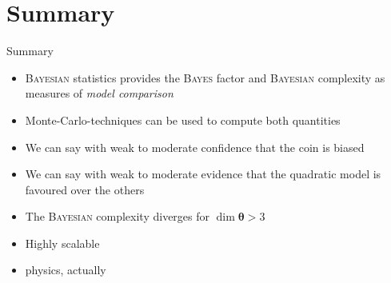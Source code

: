 \documentclass[11pt,aspectratio=1610,dvipsnames]{beamer}
\newcommand{\btheta}{\boldsymbol{\theta}}
\begin{document}
\section{Summary}
\begin{frame}{Summary}
	\begin{minipage}{0.49\linewidth}
			\begin{tcolorbox}[colback=blue!5,colframe=gray!15!black,title=Theory and methods, width=\linewidth]
			\begin{itemize}
				\item \textsc{Bayesian} statistics provides the \textsc{Bayes} factor and \textsc{Bayesian} complexity as measures of \emph{model comparison}
				\item Monte-Carlo-techniques can be used to compute both quantities
				\vspace{0.5cm}
			\end{itemize}
		\end{tcolorbox}
	\end{minipage}
\hfill
\begin{minipage}{0.49\linewidth}
	\begin{tcolorbox}[colback=green!5,colframe=gray!15!black,title=Examples, width=\linewidth]
		\begin{itemize}
			\item We can say with weak to moderate confidence that the coin is biased
			\item We can say with weak to moderate evidence that the quadratic model is favoured over the others
			\item The \textsc{Bayesian} complexity diverges for $\dim{\btheta}>3$ 
		\end{itemize}
	\end{tcolorbox}
\end{minipage}

\begin{minipage}{0.84\linewidth}
		\begin{tcolorbox}[colback=red!5,colframe=gray!15!black,title=Outlook, width=\linewidth]
		
			\begin{multicols}{2}
				\begin{itemize}
					\item Highly scalable
				\end{itemize}
			\columnbreak
			\begin{itemize}
				\item physics, actually
			\end{itemize}	
		

\end{multicols}
\end{tcolorbox}
\end{minipage}
\end{frame}
\end{document}
